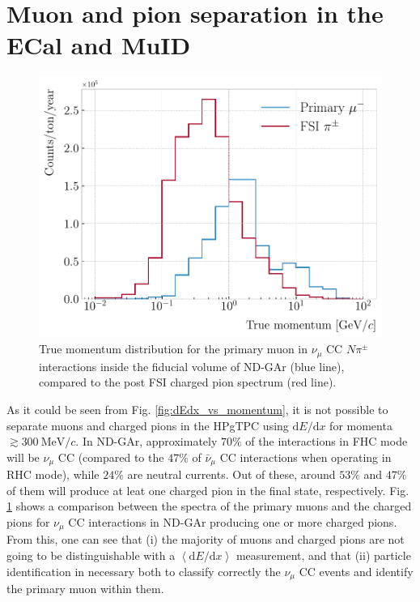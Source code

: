 \section{Muon and pion separation in the ECal and MuID}

\begin{figure}[t]
	\centering
	\includegraphics[width=.70\linewidth]{Images/GArSoft_PID/BDT/ndgar_fhc_numu_cc_mu_spectrum.pdf}
	\caption[True momentum distribution for the primary muon in $\nu_{\mu}$ CC $N\pi^{\pm}$ interactions inside the fiducial volume of ND-GAr, compared to the post FSI charged pion spectrum.]{True momentum distribution for the primary muon in $\nu_{\mu}$ CC $N\pi^{\pm}$ interactions inside the fiducial volume of ND-GAr (blue line), compared to the post FSI charged pion spectrum (red line).}
	\label{fig:primary_muon_spectrum}
\end{figure}

As it could be seen from Fig. \ref{fig:dEdx_vs_momentum}, it is not possible to separate muons and charged pions in the HPgTPC using $\mathrm{d}E/\mathrm{d}x$ for momenta $\gtrsim 300~\mathrm{MeV}/c$. In ND-GAr, approximately $70\%$ of the interactions in FHC mode will be $\nu_{\mu}$ CC (compared to the $47\%$ of $\bar{\nu}_{\mu}$ CC interactions when operating in RHC mode), while $24\%$ are neutral currents. Out of these, around $53\%$ and $47\%$ of them will produce at leat one charged pion in the final state, respectively. Fig. \ref{fig:primary_muon_spectrum} shows a comparison between the spectra of the primary muons and the charged pions for $\nu_{\mu}$ CC interactions in ND-GAr producing one or more charged pions. From this, one can see that (i) the majority of muons and charged pions are not going to be distinguishable with a $\left<\mathrm{d}E/\mathrm{d}x\right>$ measurement, and that (ii) particle identification in necessary both to classify correctly the $\nu_{\mu}$ CC events and identify the primary muon within them.

